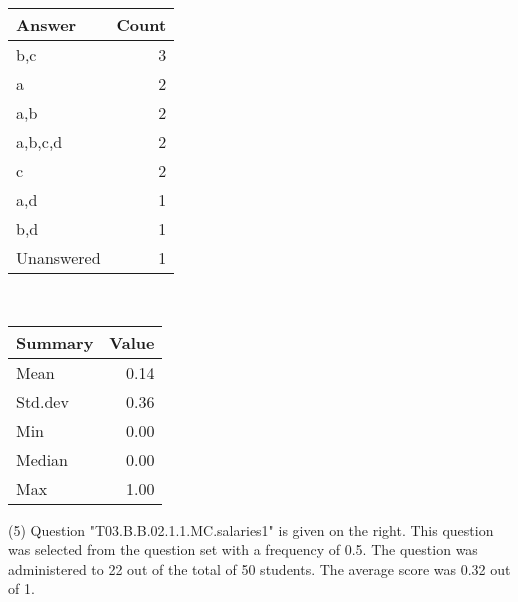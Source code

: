 \documentclass[12pt,english,nohyper]{tufte-handout}\usepackage[]{graphicx}\usepackage[]{color}
\begin{document}
\begin{center}%
\begin{tabular}{lr}
  \hline
Answer & Count \\ 
  \hline
b,c &   3 \\ 
  a &   2 \\ 
  a,b &   2 \\ 
  a,b,c,d &   2 \\ 
  c &   2 \\ 
  a,d &   1 \\ 
  b,d &   1 \\ 
  Unanswered &   1 \\ 
   \hline
\end{tabular}
~~~~~~~~%
\begin{tabular}{lr}
  \hline
Summary & Value \\ 
  \hline
Mean & 0.14 \\ 
  Std.dev & 0.36 \\ 
  Min & 0.00 \\ 
  Median & 0.00 \\ 
  Max & 1.00 \\ 
   \hline
\end{tabular}
\end{center}\newpage{} (5) Question "T03.B.B.02.1.1.MC.salaries1" is given on the right. This question was selected from the question set with a frequency of 0.5. The question was administered to 22 out of the total of 50 students. The average score was 0.32 out of 1.
\end{document}

